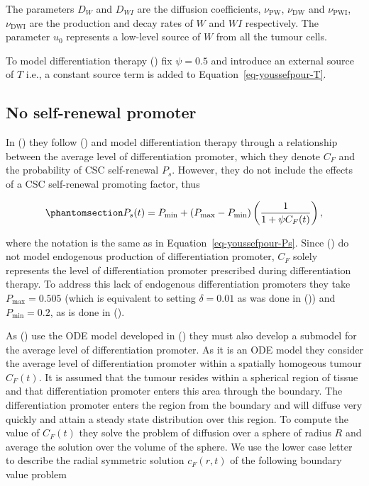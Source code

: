 \documentclass[
  letterpaper,
]{scrreprt}
\theoremstyle{definition}
\theoremstyle{remark}
\begin{document}
The parameters \(D_W\) and \(D_{WI}\) are the diffusion coefficients,
\(\nu_\text{PW}\), \(\nu_\text{DW}\) and \(\nu_\text{PWI}\),
\(\nu_\text{DWI}\) are the production and decay rates of \(W\) and
\(WI\) respectively. The parameter \(u_0\) represents a low-level source
of \(W\) from all the tumour cells.

To model differentiation therapy
() fix
\(\psi = 0.5\) and introduce an external source of \(T\) i.e., a
constant source term is added to Equation~\ref{eq-youssefpour-T}.

\subsection{No self-renewal promoter}\label{no-self-renewal-promoter}

In () they follow
() and model
differentiation therapy through a relationship between the average level
of differentiation promoter, which they denote \(C_F\) and the
probability of CSC self-renewal \(P_s\). However, they do not include
the effects of a CSC self-renewal promoting factor, thus

\begin{equation}\phantomsection\label{eq-bachman-Ps}{
P_s(t) = P_\text{min} + (P_\text{max} - P_\text{min}) \left( \frac{1}{1 + \psi C_F(t)} \right),
}\end{equation}

where the notation is the same as in Equation~\ref{eq-youssefpour-Ps}.
Since () do not model
endogenous production of differentiation promoter, \(C_F\) solely
represents the level of differentiation promoter prescribed during
differentiation therapy. To address this lack of endogenous
differentiation promoters they take \(P_\text{max} = 0.505\) (which is
equivalent to setting \(\delta = 0.01\) as was done in
()) and
\(P_\text{min} = 0.2\), as is done in
().

As () use the ODE
model developed in () they must also develop a submodel for the average level
of differentiation promoter. As it is an ODE model they consider the
average level of differentiation promoter within a spatially homogeous
tumour \(C_F(t)\). It is assumed that the tumour resides within a
spherical region of tissue and that differentiation promoter enters this
area through the boundary. The differentiation promoter enters the
region from the boundary and will diffuse very quickly and attain a
steady state distribution over this region. To compute the value of
\(C_F(t)\) they solve the problem of diffusion over a sphere of radius
\(R\) and average the solution over the volume of the sphere. We use the
lower case letter to describe the radial symmetric solution \(c_F(r,t)\)
of the following boundary value problem
\end{document}
